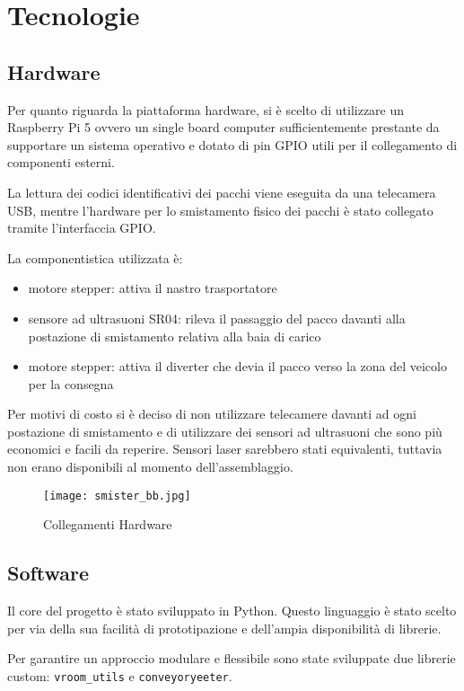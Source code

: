 \documentclass[12pt]{article}
\begin{document}
\section{Tecnologie}

\subsection{Hardware}
Per quanto riguarda la piattaforma hardware, si è scelto di utilizzare un Raspberry Pi 5 ovvero un single board computer sufficientemente prestante da supportare un sistema operativo e dotato di pin GPIO utili per il collegamento di componenti esterni. 

La lettura dei codici identificativi dei pacchi viene eseguita da una telecamera USB, mentre l'hardware per lo smistamento fisico dei pacchi è stato collegato tramite l'interfaccia GPIO.

La componentistica utilizzata è:

\begin{itemize}
    \item motore stepper: attiva il nastro trasportatore 
    \item sensore ad ultrasuoni SR04: rileva il passaggio del pacco davanti alla postazione di smistamento relativa alla baia di carico
    \item motore stepper: attiva il diverter che devia il pacco verso la zona del veicolo per la consegna
\end{itemize}

Per motivi di costo si è deciso di non utilizzare telecamere davanti ad ogni postazione di smistamento e di utilizzare dei sensori ad ultrasuoni che sono più economici e facili da reperire. Sensori laser sarebbero stati equivalenti, tuttavia non erano disponibili al momento dell'assemblaggio.

\begin{figure}[H]
    \centering
    \texttt{[image: smister\_bb.jpg]}
    \caption{Collegamenti Hardware}
    \label{immagine1}
\end{figure}

\subsection{Software}
Il core del progetto è stato sviluppato in Python. Questo linguaggio è stato scelto per via della sua facilità di prototipazione e dell'ampia disponibilità di librerie.

Per garantire un approccio modulare e flessibile sono state sviluppate due librerie custom: \texttt{vroom\_utils} e \texttt{conveyoryeeter}.
\end{document}
